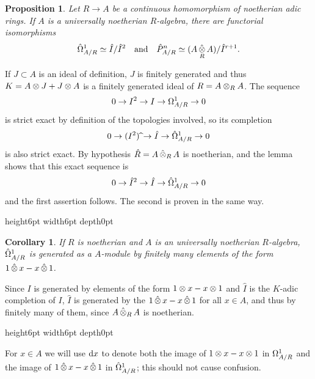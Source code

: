 \documentclass{article}
\theoremstyle{change}
\newtheorem{prop}[subsubsection]{Proposition}
\newtheorem{cor}[subsubsection]{Corollary}
\numberwithin{equation}{subsubsection}
\newcommand{\demobox}{\vrule height6pt width6pt depth0pt}
\newenvironment{demo}{\noindent{\it Proof.}}
{{\unskip\nobreak\hfil\qquad
\demobox\parfillskip=0pt\par}
\medskip}
\newcommand\hP{\hat P}
\newcommand\hI{\hat I}
\begin{document}
\begin{prop}\label{prop:Omega-hat}
  Let $R\to A$ be a continuous homomorphism of noetherian adic rings.
  If $A$ is a universally noetherian $R$-algebra, there are functorial
  isomorphisms
  \begin{displaymath}
    \cdiff_{A/R}\simeq\hI/\hI^2
    \quad\text{and}\quad
    \hP^n_{A/R}\simeq(A\ctens_RA)/\hI^{r+1}.
  \end{displaymath}
\end{prop}
\begin{demo}
  If $J\subset A$ is an ideal of definition, $J$ is finitely generated
  and thus $K=A\otimes J+J\otimes A$ is a finitely generated ideal of
  $R=A\otimes_RA$. The sequence
  \begin{displaymath}
    0\to I^2\to I\to\Omega^1_{A/R}\to 0
  \end{displaymath}
  is strict exact by definition of the topologies involved, so its
  completion
  \begin{displaymath}
    0\to (I^2)\,\widehat\relax\to\hI\to\cdiff_{A/R}\to 0
  \end{displaymath}
  is also strict exact. By hypothesis $\hat R=A\mathop{\hat\otimes}_RA$ is
  noetherian, and the lemma shows that this exact sequence is
  \begin{displaymath}
    0\to\hI^2\to\hI\to\cdiff_{A/R}\to 0
  \end{displaymath}
  and the first assertion follows. The second is proven in the same way.
\end{demo}

\begin{cor}\label{cor:Omega-hat-finitely-generated}
  If $R$ is noetherian and $A$ is an universally noetherian
  $R$-algebra, $\hat\Omega^1_{A/R}$ is generated as a $A$-module by finitely
  many elements of the form $1\mathop{\hat\otimes} x-x\mathop{\hat\otimes}1$.
\end{cor}
\begin{demo}
  Since $I$ is generated by elements of the form $1\otimes x-x\otimes1$
  and $\hI$ is the $K$-adic completion of $I$, $\hI$ is generated by
  the $1\mathop{\hat\otimes} x-x\mathop{\hat\otimes}1$ for all $x\in A$, and thus by finitely many
  of them, since $A\mathop{\hat\otimes}_RA$ is noetherian.
\end{demo}

For $x\in A$ we will use $\mathrm{d} x$ to denote both the image of
$1\otimes x-x\otimes1$ in $\Omega^1_{A/R}$ and the image of
$1\mathop{\hat\otimes} x-x\mathop{\hat\otimes}1$ in $\hat\Omega^1_{A/R}$; this should not cause
confusion.
\end{document}
